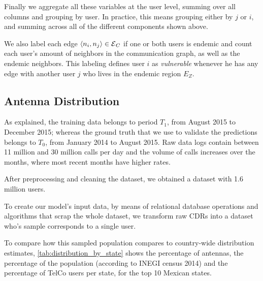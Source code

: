 
Finally we aggregate all these variables at the user level, summing over all columns and grouping by user.
In practice, this means grouping either by $j$ or $i$, and summing across all of the different components shown above.

We also label each edge $\left< n_i, n_j \right> \in \operatorname{\mathcal{E}}_C$ if one or both users is endemic and count each user's amount of neighbors in the communication graph, as well as the endemic neighbors.
This labeling defines user $i$ as \textit{vulnerable} whenever he has any edge with another user $j$ who lives in the endemic region $E_Z$.


\subsection{Antenna Distribution}\label{subsection:antenna_distribution}

As explained, the training data belongs to period $T_1$, from August 2015 to December 2015;
whereas the ground truth that we use to validate the predictions belongs to $T_0$, from January 2014 to August 2015.
Raw data logs contain between 11 million and 30 million calls per day and the volume of calls increases over the months, where most recent months have higher rates.

After preprocessing and cleaning the dataset, we obtained a dataset with 1.6 million users.

To create our model's input data, by means of relational database operations and algorithms that scrap the whole dataset, we transform raw CDRs into a dataset who's sample corresponds to a single user.


To compare how this sampled population compares to country-wide distribution estimates,
\cref{tab:distribution_by_state} shows the percentage of antennas, the percentage of the population (according to INEGI census 2014) and
the percentage of TelCo users per state, for the top 10 Mexican states.


